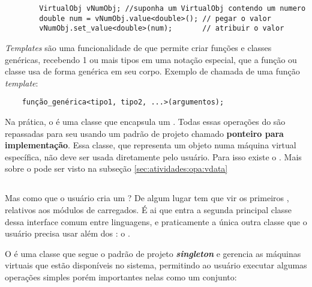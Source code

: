 \begin{itemize}
\begin{lstlisting}
        VirtualObj vNumObj; //suponha um VirtualObj contendo um numero
        double num = vNumObj.value<double>(); // pegar o valor
        vNumObj.set_value<double>(num);       // atribuir o valor
      \end{lstlisting}
  \end{itemize}

  \begin{framed}
    \textit{Templates} são uma funcionalidade de \CXX{} que permite
    criar funções e classes genéricas, recebendo 1 ou mais tipos\footnotemark{} em uma notação especial,
    que a função ou classe usa de forma genérica em seu corpo. Exemplo de chamada de uma
    função \textit{template}:
  \begin{verbatim}
    função_genérica<tipo1, tipo2, ...>(argumentos);\end{verbatim}
  \end{framed}
  
  
  Na prática, o \VObj{} é uma classe que encapsula um \VData{}. Todas essas operações do
  \VObj{} são repassadas para seu \VData{} usando um padrão de projeto chamado
  \textbf{ponteiro para implementação}\footnotemark{}. Essa classe, que representa um objeto numa máquina
  virtual específica, não deve ser usada diretamente pelo usuário. Para isso existe o
  \VObj{}. Mais sobre o \VData{} pode ser visto na subseção \ref{sec:atividades:opa:vdata}
  
  
  \subsection{\SMgr{}}
  \label{sec:atividades:opa:smgr}
  Mas como que o usuário cria um \VObj{}? De algum lugar tem que vir os primeiros , relativos
  aos módulos de \script{} carregados. É ai que entra a segunda principal classe dessa interface comum
  entre linguagens, e praticamente a única outra classe que o usuário precisa usar além dos :
  o \SMgr{}.
  
  O \SMgr{} é uma classe que segue o padrão de projeto
  \textbf{\textit{singleton}}\footnotemark{} e gerencia as máquinas virtuais que
  estão disponíveis no sistema, permitindo ao usuário executar algumas operações
  simples porém importantes nelas como um conjunto:

